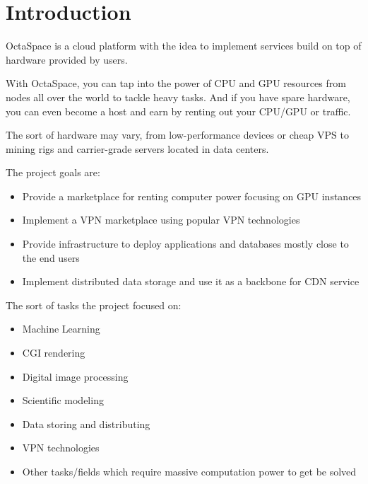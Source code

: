 \section{Introduction}

OctaSpace is a cloud platform with the idea to implement services build on top of hardware provided by users.

With OctaSpace, you can tap into the power of CPU and GPU resources from nodes all over the world to tackle heavy tasks.
And if you have spare hardware, you can even become a host and earn by renting out your CPU/GPU or traffic.

The sort of hardware may vary, from low-performance devices or cheap VPS to mining rigs and carrier-grade servers located in data centers.

The project goals are:

\begin{itemize}
    \item Provide a marketplace for renting computer power focusing on GPU instances
    \item Implement a VPN marketplace using popular VPN technologies
    \item Provide infrastructure to deploy applications and databases mostly close to the end users
    \item Implement distributed data storage and use it as a backbone for CDN service
\end{itemize}

The sort of tasks the project focused on:

\begin{itemize}
    \item Machine Learning
    \item CGI rendering
    \item Digital image processing
    \item Scientific modeling
    \item Data storing and distributing
    \item VPN technologies
    \item Other tasks/fields which require massive computation power to get be solved
\end{itemize}

